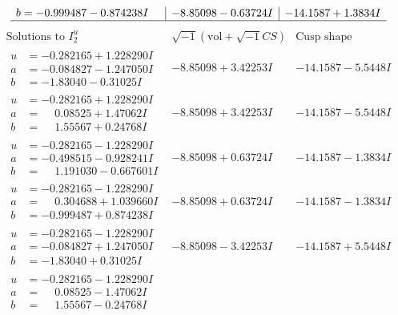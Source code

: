 \documentclass[1p]{elsarticle_modified}
\theoremstyle{definition}
\newcommand{\I}{\sqrt{-1}}
\begin{document}
$$\begin{array}{c|c|c}
\begin{aligned}
b &= -0.999487 - 0.874238 I\end{aligned}
 & -8.85098 - 0.63724 I & -14.1587 + 1.3834 I\\
 \hline 
 \end{array}$$\newpage$$\begin{array}{c|c|c}  
\text{Solutions to }I^u_{2}& \I (\text{vol} + \sqrt{-1}CS) & \text{Cusp shape}\\
 \hline 
\begin{aligned}
u &= -0.282165 + 1.228290 I \\
a &= -0.084827 - 1.247050 I \\
b &= -1.83040 - 0.31025 I\end{aligned}
 & -8.85098 + 3.42253 I & -14.1587 - 5.5448 I \\ \hline\begin{aligned}
u &= -0.282165 + 1.228290 I \\
a &= \phantom{-}0.08525 + 1.47062 I \\
b &= \phantom{-}1.55567 + 0.24768 I\end{aligned}
 & -8.85098 + 3.42253 I & -14.1587 - 5.5448 I \\ \hline\begin{aligned}
u &= -0.282165 - 1.228290 I \\
a &= -0.498515 - 0.928241 I \\
b &= \phantom{-}1.191030 - 0.667601 I\end{aligned}
 & -8.85098 + 0.63724 I & -14.1587 - 1.3834 I \\ \hline\begin{aligned}
u &= -0.282165 - 1.228290 I \\
a &= \phantom{-}0.304688 + 1.039660 I \\
b &= -0.999487 + 0.874238 I\end{aligned}
 & -8.85098 + 0.63724 I & -14.1587 - 1.3834 I \\ \hline\begin{aligned}
u &= -0.282165 - 1.228290 I \\
a &= -0.084827 + 1.247050 I \\
b &= -1.83040 + 0.31025 I\end{aligned}
 & -8.85098 - 3.42253 I & -14.1587 + 5.5448 I \\ \hline\begin{aligned}
u &= -0.282165 - 1.228290 I \\
a &= \phantom{-}0.08525 - 1.47062 I \\
b &= \phantom{-}1.55567 - 0.24768 I\end{aligned}

\end{array}$$
\end{document}
